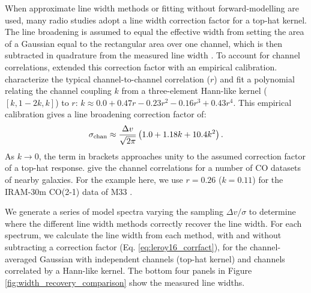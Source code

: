 \documentclass{rnaastex}
\begin{document}

When approximate line width methods or fitting without forward-modelling are used, many radio studies adopt a line width correction factor for a top-hat kernel.  The line broadening is assumed to equal the effective width from setting the area of a Gaussian equal to the rectangular area over one channel, which is then subtracted in quadrature from the measured line width \citep{cprops}.  To account for channel correlations, \citet{leroy2016} extended this correction factor with an empirical calibration.  \citet{leroy2016} characterize the typical channel-to-channel correlation ($r$) and fit a polynomial relating the channel coupling $k$ from a three-element Hann-like kernel ($[k, 1 - 2k, k]$) to $r$: $k\approx 0.0 + 0.47r - 0.23r^2 - 0.16r^3 + 0.43 r^4$. This empirical calibration gives a line broadening correction factor of:
\begin{equation}
    \label{eq:leroy16_corrfact}
    \sigma_{\rm chan} \approx \frac{\Delta v}{\sqrt{2\pi}} \left( 1.0 + 1.18k + 10.4 k^2 \right).
\end{equation}
As $k\rightarrow0$, the term in brackets approaches unity to the assumed correction factor of a top-hat response.  \citet{sun2018} give the channel correlations for a number of CO datasets of nearby galaxies. For the example here, we use $r=0.26$ ($k=0.11$) for the IRAM-30m CO(2-1) data of M33 \citep{druard2014}.



We generate a series of model spectra varying the sampling $\Delta v / \sigma$ to determine where the different line width methods correctly recover the line width. For each spectrum, we calculate the line width from each method, with and without subtracting a correction factor (Eq. \ref{eq:leroy16_corrfact}), for the channel-averaged Gaussian with independent channels (top-hat kernel) and channels correlated by a Hann-like kernel. The bottom four panels in Figure \ref{fig:width_recovery_comparison} show the measured line widths.
\end{document}
